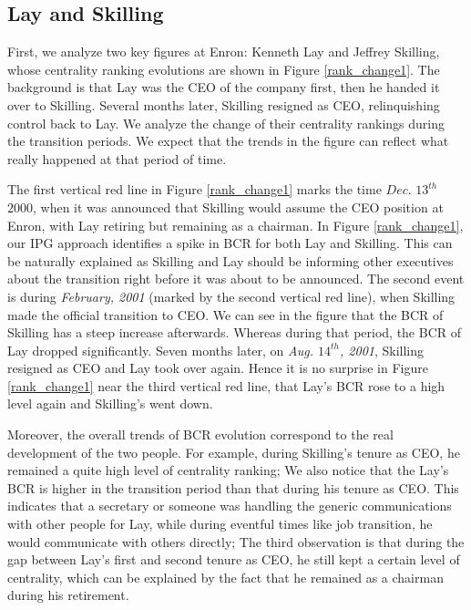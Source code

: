 \documentclass[\main/thesis.tex]{subfiles}
\begin{document}
\subsection*{Lay and Skilling}
First, we analyze two key figures at Enron: Kenneth Lay and Jeffrey Skilling, whose centrality ranking evolutions are shown in Figure \ref{rank_change1}. The background is that Lay was the CEO of the company first, then he handed it over to Skilling. Several months later, Skilling resigned as CEO, relinquishing control back to Lay. We analyze the change of their centrality rankings during the transition periods. We expect that the trends in the figure can reflect what really happened at that period of time.

The first vertical red line in Figure \ref{rank_change1} marks the time $\textit{Dec. $13^{th}$}$ $\textit{2000}$, when it was announced that Skilling would assume the CEO position at Enron, with Lay retiring but remaining as a chairman. In Figure \ref{rank_change1}, our IPG approach identifies a spike in BCR for both Lay and Skilling. This can be naturally explained as Skilling and Lay should be informing other executives about the transition right before it was about to be announced. The second event is during \textit{February, 2001} (marked by the second vertical red line), when Skilling made the official transition to CEO. We can see in the figure that the BCR of Skilling has a steep increase afterwards. Whereas during that period, the BCR of Lay dropped significantly. Seven months later, on \textit{Aug. $14^{th}$, 2001}, Skilling resigned as CEO and Lay took over again. Hence it is no surprise in Figure \ref{rank_change1} near the third vertical red line, that Lay's BCR rose to a high level again and Skilling's went down. 

Moreover, the overall trends of BCR evolution correspond to the real development of the two people. For example, during Skilling's tenure as CEO, he remained a quite high level of centrality ranking; We also notice that the Lay's BCR is higher in the transition period than that during his tenure as CEO. This indicates that a secretary or someone was handling the generic communications with other people for Lay, while during eventful times like job transition, he would communicate with others directly; The third observation is that during the gap between Lay's first and second tenure as CEO, he still kept a certain level of centrality, which can be explained by the fact that he remained as a chairman during his retirement.
\end{document}
